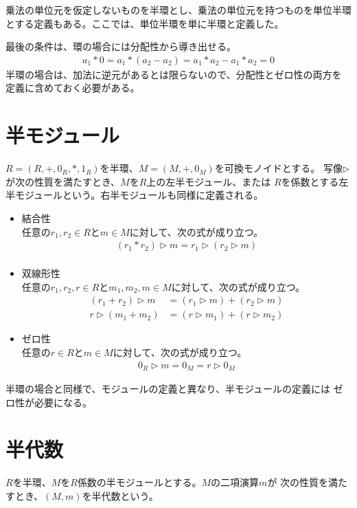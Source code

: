 	乗法の単位元を仮定しないものを半環とし、乗法の単位元を持つものを単位半環
	とする定義もある。ここでは、単位半環を単に半環と定義した。

	最後の条件は、環の場合には分配性から導き出せる。
	\begin{equation*}\begin{split} %
		a_1*0=a_1*(a_2-a_2)=a_1*a_2-a_1*a_2=0
	\end{split}\end{equation*} %
	半環の場合は、加法に逆元があるとは限らないので、分配性とゼロ性の両方を
	定義に含めておく必要がある。

\section{半モジュール}\label{s1:半モジュール} %
	\begin{definition}[半モジュール]\label{def:半モジュール} %
		$R=(R,+,0_R,*,1_R)$を半環、$M=(M,+,0_M)$を可換モノイドとする。
		写像$\rhd$が次の性質を満たすとき、$M$を$R$上の左半モジュール、または
		$R$を係数とする左半モジュールという。右半モジュールも同様に定義される。
		\begin{itemize}
			\item 結合性 \\
			任意の$r_1,r_2\in R$と$m\in M$に対して、次の式が成り立つ。
			\begin{equation}\begin{split} %
				(r_1*r_2)\rhd m = r_1\rhd (r_2\rhd m) \\
			\end{split}\end{equation} %
			\item 双線形性 \\
			任意の$r_1,r_2,r\in R$と$m_1,m_2,m\in M$に対して、次の式が成り立つ。
			\begin{equation}\begin{split} %
				(r_1+r_2)\rhd m &= (r_1\rhd m)+(r_2\rhd m) \\
				r\rhd (m_1+m_2) &= (r\rhd m_1)+(r\rhd m_2)
			\end{split}\end{equation} %
			\item ゼロ性 \\
			任意の$r\in R$と$m\in M$に対して、次の式が成り立つ。
			\begin{equation}\begin{split} %
				0_R\rhd m = 0_M = r\rhd 0_M
			\end{split}\end{equation} %
		\end{itemize}
	\end{definition} %

	半環の場合と同様で、モジュールの定義と異なり、半モジュールの定義には
	ゼロ性が必要になる。

\section{半代数}\label{s1:半代数} %
	\begin{definition}[半代数]\label{def:半代数} %
		$R$を半環、$M$を$R$係数の半モジュールとする。$M$の二項演算$m$が
		次の性質を満たすとき、$(M,m)$を半代数という。
	\end{definition} %
